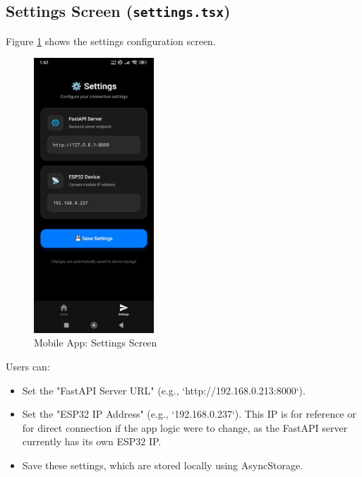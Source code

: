 \documentclass[12pt, a4paper]{report}
\begin{document}
\subsection{Settings Screen (\texttt{settings.tsx})}
Figure \ref{fig:mobile_settings_screen} shows the settings configuration screen.
\begin{figure}[H]
    \centering
    \includegraphics[width=0.4\textwidth]{fig/mobile_settings.jpg}
    \caption{Mobile App: Settings Screen}
    \label{fig:mobile_settings_screen}
\end{figure}
Users can:
\begin{itemize}
    \item Set the "FastAPI Server URL" (e.g., `http://192.168.0.213:8000`).
    \item Set the "ESP32 IP Address" (e.g., `192.168.0.237`). This IP is for reference or for direct connection if the app logic were to change, as the FastAPI server currently has its own ESP32 IP.
    \item Save these settings, which are stored locally using AsyncStorage.
\end{itemize}
\end{document}
